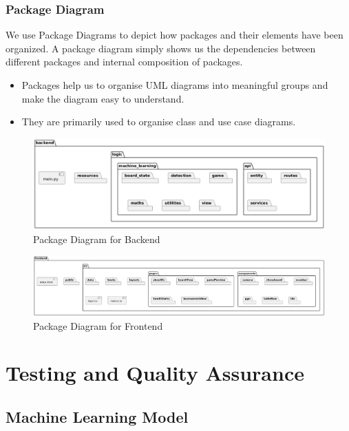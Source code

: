 \newpage

\subsubsection*{Package Diagram}

We use Package Diagrams to depict how packages and their elements have been organized. A package diagram simply shows us the dependencies between different packages and internal composition of packages.

\begin{itemize}
    \item Packages help us to organise UML diagrams into meaningful groups and make the diagram easy to understand.
    \item They are primarily used to organise class and use case diagrams.
\end{itemize}

\begin{figure}[h!]
    \centering
    \includegraphics[width=\linewidth]{figures/results//uml/package-backend.png}
    \caption{Package Diagram for Backend}
    \label{fig:package-backend}
\end{figure}

\begin{figure}[h!]
    \centering
    \includegraphics[width=\linewidth]{figures/results//uml/package-frontend.png}
    \caption{Package Diagram for Frontend}
    \label{fig:package-frontend}
\end{figure}

\section{Testing and Quality Assurance}

\subsection{Machine Learning Model}
\label{machine-learning-test}

